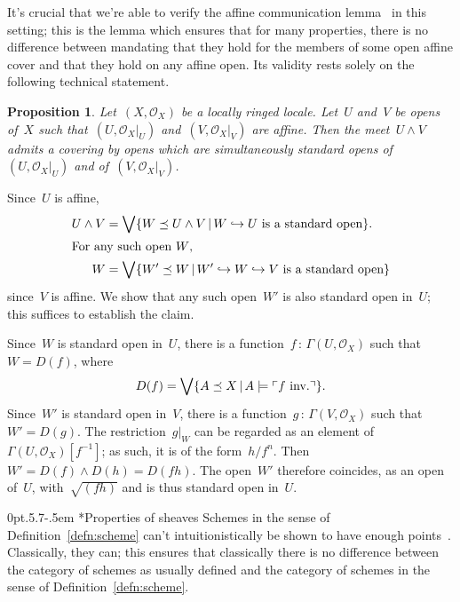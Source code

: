 \documentclass[10pt,reqno,a4paper]{amsbook}
\makeatletter
\theoremstyle{definition}
\theoremstyle{plain}
\newtheorem{prop}[defn]{Proposition}
\theoremstyle{remark}
\renewcommand{\O}{\mathcal{O}}
\newcommand{\?}{\,{:}\,}
\renewcommand{\_}{\mathpunct{.}\,}
\newcommand{\speak}[1]{\ulcorner\text{\textnormal{#1}}\urcorner}
\newcommand{\inv}{inv.\@}
\renewenvironment{proof}[1][\proofname]{\par
  \pushQED{\qed}%
  \normalfont \topsep6\p@\@plus6\p@\relax
  \trivlist
  \item[\hskip\labelsep
        \itshape
    #1\@addpunct{.}]\ignorespaces
}{%
  \popQED\endtrivlist\@endpefalse
}
\def\subsection{\@startsection{subsection}{2}%
  {0pt}{.5\linespacing\@plus.7\linespacing}{-.5em}%
  {\normalfont\bfseries}}
\makeatother
\begin{document}
{It's crucial that we're able to verify the affine communication
lemma~\cite[Lemma~5.3.2]{vakil:foag} in this setting; this is the lemma which
ensures that for many properties, there is no difference between mandating that
they hold for the members of some open affine cover and that they hold on any
affine open. Its validity rests solely on the following technical statement.

\begin{prop}Let~$(X,\O_X)$ be a locally ringed locale. Let~$U$ and~$V$ be opens of~$X$
such that~$(U,\O_X|_U)$ and~$(V,\O_X|_V)$ are affine. Then the meet~$U \wedge
V$ admits a covering by opens which are simultaneously standard opens
of~$(U,\O_X|_U)$ and of~$(V,\O_X|_V)$.
\end{prop}

\begin{proof}Since~$U$ is affine,
\begin{align*}
  U \wedge V &= \bigvee \{ W \preceq U \wedge V \,|\,
  \text{$W \hookrightarrow U$ is a standard open} \}. \\
\intertext{For any such open~$W$,}
  W &= \bigvee \{ W' \preceq W \,|\,
  \text{$W' \hookrightarrow W \hookrightarrow V$ is a standard open} \}
\end{align*}
since~$V$ is affine. We show that any such open~$W'$ is also standard open
in~$U$; this suffices to establish the claim.

Since~$W$ is standard open in~$U$, there is a function~$f \? \Gamma(U,\O_X)$
such that~$W = D(f)$, where
\[ D(f) = \bigvee \{ A \preceq X \,|\, A \models \speak{$f$ \inv} \}. \]
Since~$W'$ is standard open in~$V$, there is a function~$g \? \Gamma(V,\O_X)$
such that~$W' = D(g)$. The restriction~$g|_W$ can be regarded
as an element of~$\Gamma(U,\O_X)[f^{-1}]$; as such, it is of the form~$h/f^n$.
Then~$W' = D(f) \wedge D(h) = D(fh)$. The
open~$W'$ therefore coincides, as an open of~$U$, with~$\sqrt{(fh)}$ and is thus
standard open in~$U$.
\end{proof}


\subsection*{Properties of sheaves} Schemes in the sense of
Definition~\ref{defn:scheme} can't intuitionistically be shown to have enough
points~\cite{tierney:spectrum}. Classically, they can; this ensures that
classically there is no difference between the category of schemes as usually
defined and the category of schemes in the sense of
Definition~\ref{defn:scheme}.

}
\end{document}
